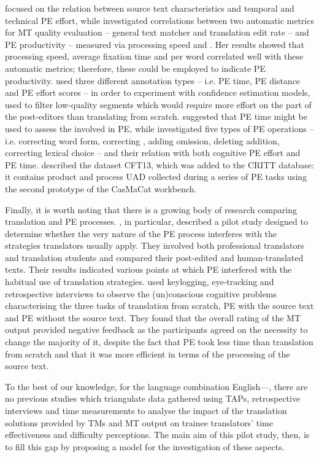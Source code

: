 \documentclass[output=paper]{LSP/langsci}
\begin{document}
 focused on the relation between source text characteristics and temporal and technical PE effort, while \citet{OBrien2011} investigated correlations between two automatic metrics for MT quality evaluation -- general text matcher and translation edit rate -- and PE productivity -- measured via processing speed and . Her results showed that processing speed, average fixation time and  per word correlated well with these automatic metrics; therefore, these could be employed to indicate PE productivity. \citet{Specia2011} used three different annotation types -- i.e. PE time, PE distance and PE effort scores -- in order to experiment with confidence estimation models, used to filter low-quality segments which would require more effort on the part of the post-editors than translating from scratch. \citet{Koponen2012} suggested that PE time might be used to assess the  involved in PE, while \citet{Popovic2014} investigated five types of PE operations -- i.e. correcting word form, correcting , adding omission, deleting addition, correcting lexical choice -- and their relation with both cognitive PE effort and PE time. \citet{Carl2014CFT13} described the dataset CFT13, which was added to the CRITT database: it contains product and process UAD collected during a series of PE tasks using the second prototype of the CasMaCat workbench.


Finally, it is worth noting that there is a growing body of research comparing translation and PE processes. , in particular, described a pilot study designed to determine whether the very nature of the PE process interferes with the strategies translators usually apply. They involved both professional translators and translation students and compared their post-edited and human-translated texts. Their results indicated various points at which PE interfered with the habitual use of translation strategies. \citet{Carl2015} used keylogging, eye-tracking and retrospective interviews to observe the (un)conscious cognitive problems characterising the three tasks of translation from scratch, PE with the source text and PE without the source text. They found that the overall rating of the MT output provided negative feedback as the participants agreed on the necessity to change the majority of it, despite the fact that PE took less time than translation from scratch and that it was more efficient in terms of the processing of the source text.


To the best of our knowledge, for the language combination English—, there are no previous studies which triangulate data gathered using TAPs, retrospective interviews and time measurements to analyse the impact of the translation solutions provided by TMs and MT output on trainee translators' time effectiveness and difficulty perceptions. The main aim of this pilot study, then, is to fill this gap by proposing a model for the investigation of these aspects.
\end{document}
